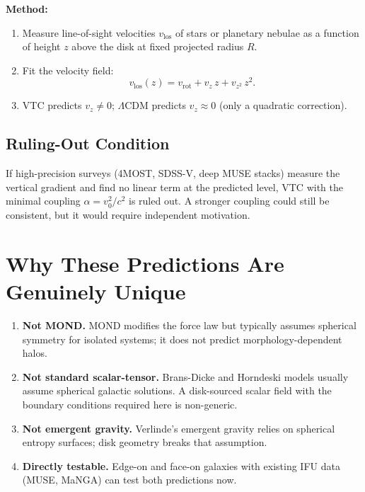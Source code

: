 \documentclass[11pt,a4paper]{article}
\theoremstyle{definition}
\begin{document}
\textbf{Method:}
\begin{enumerate}
    \item Measure line-of-sight velocities $v_{\mathrm{los}}$ of stars or planetary nebulae as a function of height $z$ above the disk at fixed projected radius $R$.
    \item Fit the velocity field:
    \begin{equation}
        v_{\mathrm{los}}(z) = v_{\mathrm{rot}} + v_z\,z + v_{z^2}\,z^2.
    \end{equation}
    \item VTC predicts $v_z\neq 0$; $\Lambda$CDM predicts $v_z\approx 0$ (only a quadratic correction).
\end{enumerate}

\subsection{Ruling-Out Condition}

If high-precision surveys (4MOST, SDSS-V, deep MUSE stacks) measure the vertical gradient and find no linear term at the predicted level, VTC with the minimal coupling $\alpha=v_0^2/c^2$ is ruled out. A stronger coupling could still be consistent, but it would require independent motivation.

\section{Why These Predictions Are Genuinely Unique}

\begin{enumerate}
    \item \textbf{Not MOND.} MOND modifies the force law but typically assumes spherical symmetry for isolated systems; it does not predict morphology-dependent halos.
    \item \textbf{Not standard scalar-tensor.} Brans-Dicke and Horndeski models usually assume spherical galactic solutions. A disk-sourced scalar field with the boundary conditions required here is non-generic.
    \item \textbf{Not emergent gravity.} Verlinde's emergent gravity relies on spherical entropy surfaces; disk geometry breaks that assumption.
    \item \textbf{Directly testable.} Edge-on and face-on galaxies with existing IFU data (MUSE, MaNGA) can test both predictions now.
\end{enumerate}
\end{document}
